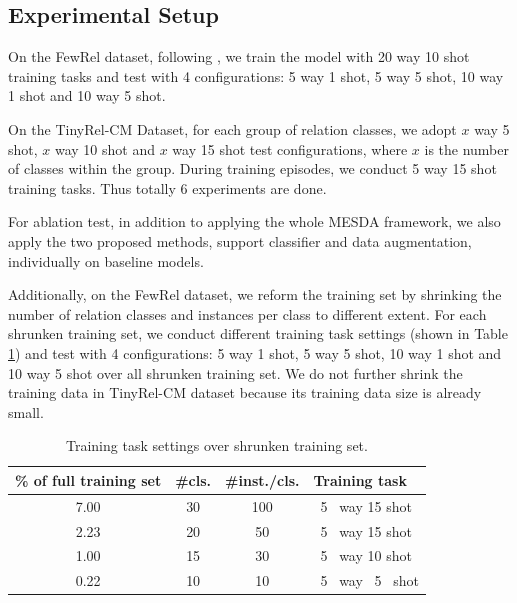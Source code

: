 \subsection{Experimental Setup}
On the FewRel dataset, following \cite{han-etal-2018-fewrel,ye-ling-2019-multi}, we train the model with 20 way 10 shot training tasks and test with 4 configurations: 5 way 1 shot, 5 way 5 shot, 10 way 1 shot and 10 way 5 shot.

On the TinyRel-CM Dataset, for each group of relation classes, we adopt $x$ way 5 shot, $x$ way 10 shot and $x$ way 15 shot test configurations, where $x$ is the number of classes within the group. During training episodes, we conduct 5 way 15 shot training tasks. Thus totally 6 experiments are done.

For ablation test, in addition to applying the whole MESDA framework, we also apply the two proposed methods, support classifier and data augmentation, individually on baseline models.

Additionally, on the FewRel dataset, we reform the training set by shrinking the number of relation classes and instances per class to different extent. For each shrunken training set, we conduct different training task settings (shown in Table \ref{trainingsetting}) and test with 4 configurations: 5 way 1 shot, 5 way 5 shot, 10 way 1 shot and 10 way 5 shot over all shrunken training set. We do not further shrink the training data in TinyRel-CM dataset because its training data size is already small.

\begin{table}[ht]
\centering
\small
\begin{tabular}{|c|c|c|l|}
\hline
\textbf{\% of full training set} & \textbf{\#cls.} & \textbf{\#inst./cls.} & \textbf{Training task} \\ \hline
7.00 & 30 & 100 & ~5 ~way 15 shot  \\ \hline
2.23 & 20 & 50 & ~5 ~way 15 shot \\ \hline
1.00 & 15 & 30 & ~5 ~way 10 shot \\ \hline
0.22 & 10 & 10 & ~5 ~way ~5~ shot \\ \hline
\end{tabular}
\caption{Training task settings over shrunken training set.}
\label{trainingsetting}
\end{table}

